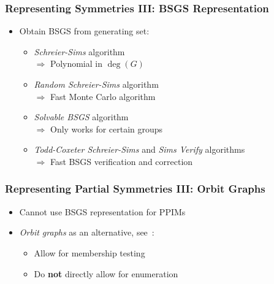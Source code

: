 \documentclass{beamer}
\begin{document}
\begin{frame}
  \frametitle{Representing Symmetries III: BSGS Representation}

  \begin{itemize}
    \item<1-> Obtain BSGS from generating set:

    \begin{itemize}
      \setlength\itemsep{.25cm}

      \item<2-> \textit{Schreier-Sims} algorithm\\
            $\Rightarrow$ Polynomial in $\operatorname{deg}(G)$
      \item<3-> \textit{Random Schreier-Sims} algorithm\\
            $\Rightarrow$ Fast Monte Carlo algorithm
      \item<4-> \textit{Solvable BSGS} algorithm\\
            $\Rightarrow$ Only works for certain groups
      \item<5-> \textit{Todd-Coxeter Schreier-Sims} and \textit{Sims Verify} algorithms\\
            $\Rightarrow$ Fast BSGS verification and correction
    \end{itemize}
  \end{itemize}
\end{frame}

\begin{frame}
  \frametitle{Representing Partial Symmetries III: Orbit Graphs}

  \begin{itemize}
    \setlength\itemsep{.25cm}

    \item<1-> Cannot use BSGS representation for PPIMs
    \item<2-> \textit{Orbit graphs} as an alternative, see~\cite{Mitchell}:
      \begin{itemize}
        \item<3-> Allow for membership testing
        \item<4-> Do \textbf{not} directly allow for enumeration
      \end{itemize}
  \end{itemize}
\end{frame}
\end{document}
